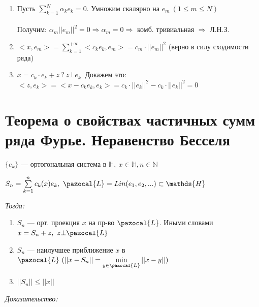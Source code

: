 \documentclass[paper=a4, fontsize=17pt]{article}
\begin{document}
\begin{enumerate}

	\item Пусть $\sum\limits_{k=1}^{N} \alpha_k e_k = 0$. Умножим скалярно на $e_m\ (1 \leqslant m \leqslant N)$\\ \\
	Получим: $\alpha_m ||e_m||^2 = 0 \Rightarrow \alpha_m = 0 \Rightarrow$ комб. тривиальная $\Rightarrow$ Л.Н.З.
	
	\item $<x, e_m> = \sum\limits_{k=1}^{+\infty} <c_k e_k, e_m> = c_m \cdot ||e_m||^2$ (верно в силу сходимости ряда)
	
	\item $x = c_k \cdot e_k + z\ ?\ z \bot e_k\ $ Докажем это:\\
	$<z, e_k> = <x - c_k e_k, e_k> = c_k \cdot ||e_k||^2 - c_k\cdot ||e_k||^2 = 0$

\end{enumerate}

\section{Теорема о свойствах частичных сумм ряда Фурье. Неравенство Бесселя}

$\{e_k\}$ {{---}} ортогональная система в $\mathds{H},\ x \in \mathds{H}, n \in \mathbb{N}$

$S_n = \sum\limits_{k=1}^{n} c_k(x)e_k,\ \pazocal{L} = Lin(e_1, e_2, ...) \subset \mathds{H}$

\emph{Тогда:}

\begin{enumerate}

	\item $S_n$ {{---}} орт. проекция $x$ на пр-во $\pazocal{L}$. Иными словами $x = S_n + z,\ z \bot \pazocal{L}$
	
	\item $S_n$ {{---}} наилучшее приближение $x$ в $\pazocal{L}\ (||x - S_n|| = \min\limits_{y \in \pazocal{L}} ||x - y||)$	

	\item $||S_n|| \leqslant ||x||$

\end{enumerate}

\emph{Доказательство:}
\end{document}
